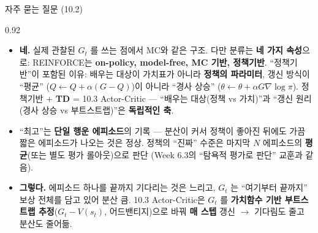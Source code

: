 \begin{frame}{자주 묻는 질문 (10.2)}
\begin{center}\begin{varwidth}{0.92\textwidth}
  \small
  \begin{itemize}
    \item {}
      \textbf{네.} 실제 관찰된 $G_t$ 를 쓰는 점에서 MC와 같은
      구조. 다만 분류는 \textbf{네 가지 속성}으로: REINFORCE는
      \textbf{on-policy, model-free, MC 기반, 정책기반}.
      ``정책기반''이 포함된 이유: 배우는 대상이 가치표가 아니라
      \textbf{정책의 파라미터}, 갱신 방식이 ``평균''
      ($Q \leftarrow Q + \alpha(G-Q)$)이 아니라 ``경사 상승''
      ($\theta \leftarrow \theta + \alpha G \nabla\log\pi$).
      정책기반 + \textbf{TD} = 10.3 Actor-Critic ---
      ``배우는 대상(정책 vs 가치)''과 ``갱신 원리(경사 상승 vs
      부트스트랩)''은 \textbf{독립적인 축}.
    \item {}
      ``최고''는 \textbf{단일 행운 에피소드}의 기록 --- 분산이
      커서 정책이 좋아진 뒤에도 가끔 짧은 에피소드가 나오는
      것은 정상. 정책의 ``진짜'' 수준은 마지막 $N$ 에피소드의
      \textbf{평균}(또는 별도 평가 롤아웃)으로 판단 (Week 6.3의
      ``탐욕적 평가로 판단'' 교훈과 같음).
    \item {}
      \textbf{그렇다.} 에피소드 하나를 끝까지 기다리는 것은 느리고,
      $G_t$ 는 ``여기부터 끝까지'' 보상 전체를 담고 있어 분산 큼.
      10.3 Actor-Critic은 $G_t$ 를 \textbf{가치함수 기반 부트스트랩
      추정}($G_t - V(s_t)$, 어드밴티지)으로 바꿔 \textbf{매 스텝}
      갱신 $\to$ 기다림도 줄고 분산도 줄어듦.
  \end{itemize}
  \normalsize
\end{varwidth}\end{center}
\end{frame}
